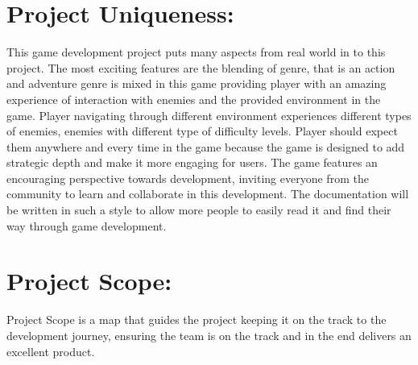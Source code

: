 \section{Project Uniqueness:}
This game development project puts many aspects from real world in to this project. The most exciting features are the blending of genre, that is an action and adventure genre is mixed in this game providing player with an amazing experience of interaction with enemies and the provided environment in the game.
Player navigating through different environment experiences different types of enemies, enemies with different type of difficulty levels. Player should expect them anywhere and every time in the game because the game is designed to add strategic depth and make it more engaging for users.
The game features an encouraging perspective towards development, inviting everyone from the community to learn and collaborate in this development. The documentation will be written in such a style to allow more people to easily read it and find their way through game development.

\section{Project Scope:}
Project Scope is a map that guides the project keeping it on the track to the development journey, ensuring the team is on the track and in the end delivers an excellent product.
